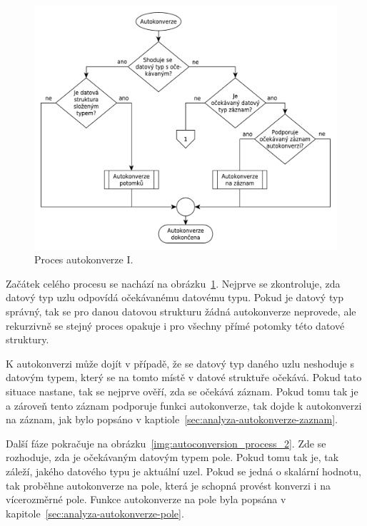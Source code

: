 \documentclass[FM,bw,DP]{tulthesis}
\begin{document}
\begin{figure}[h]
	\centering
    \includegraphics[width=\textwidth]{../img/autoconversion_process.pdf}
    \caption{Proces autokonverze I.}
	\label{img:autoconversion_process}
\end{figure}

Začátek celého procesu se nachází na obrázku~\ref{img:autoconversion_process}.  Nejprve se zkontroluje, zda datový typ uzlu odpovídá očekávanému datovému typu. Pokud je datový typ správný, tak se pro danou datovou strukturu žádná autokonverze neprovede, ale rekurzivně se stejný proces opakuje i pro všechny přímé potomky této datové struktury.

K autokonverzi může dojít v případě, že se datový typ daného uzlu neshoduje s datovým typem, který se na tomto místě v datové struktuře očekává. Pokud tato situace nastane, tak se nejprve ověří, zda se očekává záznam. Pokud tomu tak je a zároveň tento záznam podporuje funkci autokonverze, tak dojde k autokonverzi na záznam, jak bylo popsáno v kaptiole~\ref{sec:analyza-autokonverze-zaznam}.

Další fáze pokračuje na obrázku~\ref{img:autoconversion_process_2}. Zde se rozhoduje, zda je očekávaným datovým typem pole. Pokud tomu tak je, tak záleží, jakého datového typu je aktuální uzel. Pokud se jedná o skalární hodnotu, tak proběhne autokonverze na pole, která je schopná provést konverzi i na vícerozměrné pole. Funkce autokonverze na pole byla popsána v kapitole~\ref{sec:analyza-autokonverze-pole}.

\clearpage
\end{document}
